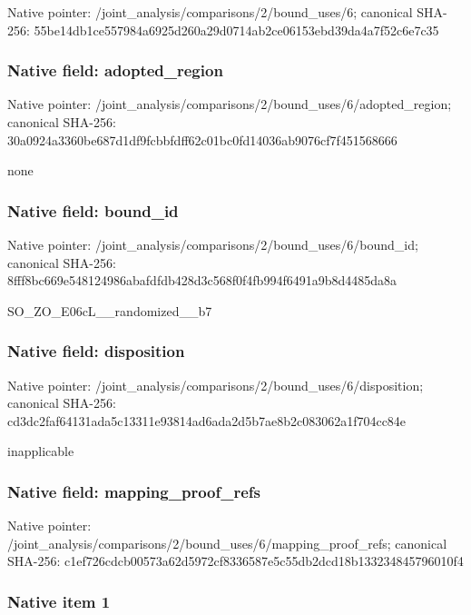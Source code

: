\documentclass[10pt,a4paper]{article}
\begin{document}
Native pointer: /joint\_analysis/comparis\allowbreak{}ons/2/bound\_uses/6; canonical SHA-256: 55be14db1ce557984a6925d2\allowbreak{}60a29d0714ab2ce06153ebd3\allowbreak{}9da4a7f52c6e7c35



\subsubsection{Native field: adopted\_region}


Native pointer: /joint\_analysis/comparis\allowbreak{}ons/2/bound\_uses/6/adopt\allowbreak{}ed\_region; canonical SHA-256: 30a0924a3360be687d1df9fc\allowbreak{}bbfdff62c01bc0fd14036ab9\allowbreak{}076cf7f451568666


none


\subsubsection{Native field: bound\_id}


Native pointer: /joint\_analysis/comparis\allowbreak{}ons/2/bound\_uses/6/bound\allowbreak{}\_id; canonical SHA-256: 8fff8bc669e548124986abaf\allowbreak{}dfdb428d3c568f0f4fb994f6\allowbreak{}491a9b8d4485da8a


SO\_ZO\_E06cL\_\_randomized\_\_b7


\subsubsection{Native field: disposition}


Native pointer: /joint\_analysis/comparis\allowbreak{}ons/2/bound\_uses/6/dispo\allowbreak{}sition; canonical SHA-256: cd3dc2faf64131ada5c13311\allowbreak{}e93814ad6ada2d5b7ae8b2c0\allowbreak{}83062a1f704cc84e


inapplicable


\subsubsection{Native field: mapping\_proof\_refs}


Native pointer: /joint\_analysis/comparis\allowbreak{}ons/2/bound\_uses/6/mappi\allowbreak{}ng\_proof\_refs; canonical SHA-256: c1ef726cdcb00573a62d5972\allowbreak{}cf8336587e5c55db2dcd18b1\allowbreak{}33234845796010f4



\subsubsection{Native item 1}
\end{document}
